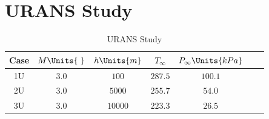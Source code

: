 \section{URANS Study\label{ch4:uransStudy}}
\begin{table}[H]
    \begin{center}
        \begin{tabular}{|c|c|c|c|c|c|c|}
            \hline
            Case & $M\Units{\;}$ & $h\Units{m}$ & $T_{\infty}$ &
            $P_{\infty}\Units{kPa}$  \\ 
            \hline \hline
            1U & $3.0$ & $100$ &   $287.5$ & $100.1$ \\ \hline
            2U & $3.0$ & $5000$ &  $255.7$ & $54.0$  \\ \hline
            3U & $3.0$ & $10000$ & $223.3$ & $26.5$  \\\hline 
        \end{tabular}
    \caption{URANS Study \label{tab:uransStudy}}
    \end{center}
\end{table}
